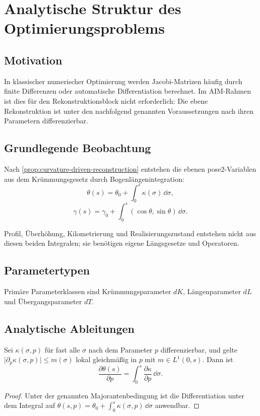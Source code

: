 \section{Analytische Struktur des Optimierungsproblems}
\subsection{Motivation}
In klassischer numerischer Optimierung werden Jacobi-Matrizen häufig durch
finite Differenzen oder automatische Differentiation berechnet. Im AIM-Rahmen
ist dies für den Rekonstruktionsblock nicht erforderlich: Die ebene
Rekonstruktion ist unter den nachfolgend genannten Voraussetzungen nach ihren
Parametern differenzierbar.

\subsection{Grundlegende Beobachtung}
\begin{corollary}
\label{cor:planar-reconstruction-integrals}
Nach \cref{prop:curvature-driven-reconstruction} entstehen die ebenen
pose2-Variablen aus dem Krümmungsgesetz durch Bogenlängenintegration:
\[
\theta(s)=\theta_0+\int_0^s\kappa(\sigma)\,\dd\sigma,
\]
\[
\gamma(s)=\gamma_0+\int_0^s(\cos\theta,\sin\theta)\,\dd\sigma.
\]
\end{corollary}

Profil, Überhöhung, Kilometrierung und Realisierungszustand entstehen nicht
aus diesen beiden Integralen; sie benötigen eigene Längsgesetze und
Operatoren.

\subsection{Parametertypen}
\begin{definition}
Primäre Parameterklassen sind Krümmungsparameter \(dK\), Längenparameter
\(dL\) und Übergangsparameter \(dT\).
\end{definition}

\subsection{Analytische Ableitungen}
\begin{proposition}
\label{prop:heading-parameter-derivative}
Sei \(\kappa(\sigma,p)\) für fast alle \(\sigma\) nach dem Parameter \(p\)
differenzierbar, und gelte
\(\lvert\partial_p\kappa(\sigma,p)\rvert\le m(\sigma)\) lokal gleichmäßig in
\(p\) mit \(m\in L^1(0,s)\). Dann ist
\[
\frac{\partial\theta(s)}{\partial p}
=\int_0^s\frac{\partial\kappa}{\partial p}\,\dd\sigma.
\]
\end{proposition}
\begin{proof}
Unter der genannten Majorantenbedingung ist die Differentiation unter dem
Integral auf
\(\theta(s,p)=\theta_0+\int_0^s\kappa(\sigma,p)\,\dd\sigma\) anwendbar.
\end{proof}

